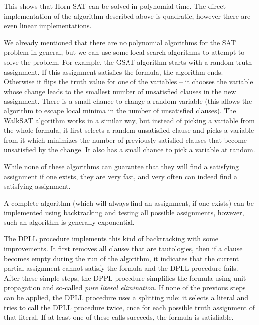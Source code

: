 This shows that Horn-SAT can be solved in polynomial time. The direct implementation of the algorithm described above is quadratic, however there are even linear implementations.

We already mentioned that there are no polynomial algorithms for the SAT problem in general, but we can use some local search algorithms to attempt to solve the problem. For example, the GSAT algorithm starts with a random truth assignment. If this assignment satisfies the formula, the algorithm ends. Otherwise it flips the truth value for one of the variables -- it chooses the variable whose change leads to the smallest number of unsatisfied clauses in the new assignment. There is a small chance to change a random variable (this allows the algorithm to escape local minima in the number of unsatisfied clauses). The WalkSAT algorithm works in a similar way, but instead of picking a variable from the whole formula, it first selects a random unsatisfied clause and picks a variable from it which minimizes the number of previously satisfied clauses that become unsatisfied by the change. It also has a small chance to pick a variable at random. 

While none of these algorithms can guarantee that they will find a satisfying assignment if one exists, they are very fast, and very often can indeed find a satisfying assignment.

A complete algorithm (which will always find an assignment, if one exists) can be implemented using backtracking and testing all possible assignments, however, such an algorithm is generally exponential. 

The DPLL procedure implements this kind of backtracking with some improvements. It first removes all clauses that are tautologies, then if a clause becomes empty during the run of the algorithm, it indicates that the current partial assignment cannot satisfy the formula and the DPLL procedure fails. After these simple steps, the DPPL procedure simplifies the formula using unit propagation and so-called \emph{pure literal elimination}. If none of the previous steps can be applied, the DPLL procedure uses a splitting rule: it selects a literal and tries to call the DPLL procedure twice, once for each possible truth assignment of that literal. If at least one of these calls succeeds, the formula is satisfiable.


